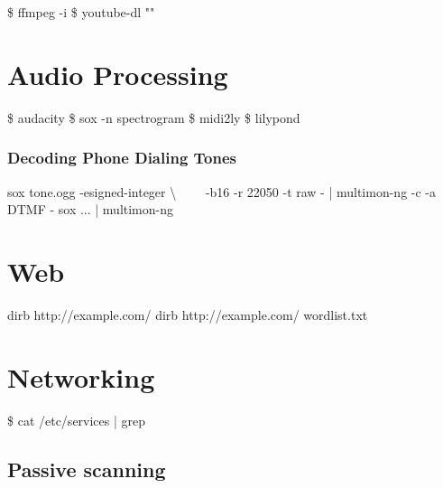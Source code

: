 \documentclass{refcard}
\begin{document}
\begin{ldesc}
	  \$ ffmpeg -i  
	 \$ youtube-dl ""
\end{ldesc}


\section{Audio Processing}

\begin{ldesc}
	   \$ audacity 
	\li[Spectrogram]                   \$ sox  -n spectrogram
	       \$ midi2ly 
	          \$ lilypond 
\end{ldesc}

\subsubsection{Decoding Phone Dialing Tones}

\begin{ldesc}
	   sox tone.ogg -esigned-integer \textbackslash \li
	                   ~~~~-b16 -r 22050 -t raw - | \li
	                   multimon-ng -c -a DTMF -
	 sox ... | multimon-ng
\end{ldesc}


\section{Web}

\begin{ldesc}
	       dirb http://example.com/
	 dirb http://example.com/ wordlist.txt
\end{ldesc}


\pagebreak

\section{Networking}

\begin{ldesc}
	 \$ cat /etc/services | grep 
\end{ldesc}

\subsection{Passive scanning}
\end{document}

